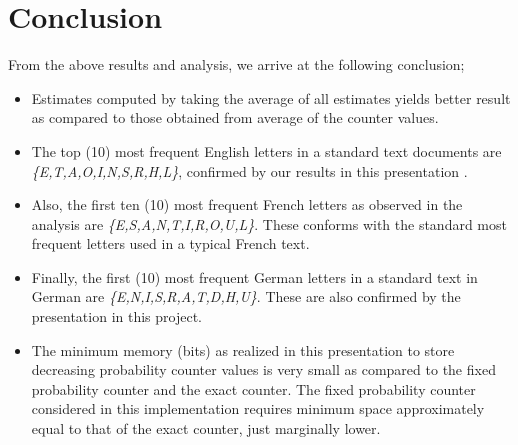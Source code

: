 \documentclass[longpaper, english, final, times]{revdetua}
\begin{document}
	\section{Conclusion}
		From the above results and analysis, we arrive at the following conclusion;
		\begin{itemize}
			\setlength\itemsep{1em}
			\item Estimates computed by taking the average of all estimates yields better result as compared to those obtained from average of the counter values.
			\item The top (10) most frequent English letters in a standard text documents are \textit{\{E,T,A,O,I,N,S,R,H,L\}}, confirmed by our results in this presentation \cite{letter_frequency}.
			\item Also, the first ten (10) most frequent French letters as observed in the analysis are \textit{\{E,S,A,N,T,I,R,O,U,L\}}. These conforms with the standard most frequent letters used in a typical French text.
			\item Finally, the first (10) most frequent German letters in a standard text in German are \textit{\{E,N,I,S,R,A,T,D,H,U\}}. These are also confirmed by the presentation in this project.
			\item The minimum memory (bits) as realized in this presentation to store decreasing probability counter values is very small as compared to the fixed probability counter and the exact counter. The fixed probability counter considered in this implementation requires minimum space approximately equal to that of the exact counter, just marginally lower.
		\end{itemize}
		
	
\end{document}

